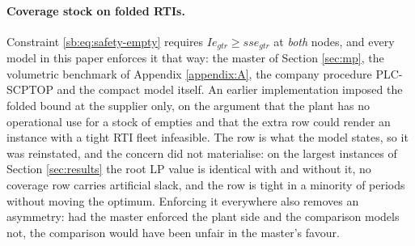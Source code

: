 \paragraph{Coverage stock on folded RTIs.}
Constraint \eqref{sb:eq:safety-empty} requires $Ie_{gtr}\ge sse_{gtr}$ at
\emph{both} nodes, and every model in this paper enforces it that way:
the master of Section \ref{sec:mp}, the volumetric benchmark of
Appendix \ref{appendix:A}, the company procedure PLC-SCPTOP and the
compact model itself. An earlier implementation imposed the folded bound
at the supplier only, on the argument that the plant has no operational
use for a stock of empties and that the extra row could render an
instance with a tight RTI fleet infeasible. The row is what the model
states, so it was reinstated, and the concern did not materialise: on
the largest instances of Section \ref{sec:results} the root LP value is
identical with and without it, no coverage row carries artificial slack,
and the row is tight in a minority of periods without moving the
optimum. Enforcing it everywhere also removes an asymmetry: had the
master enforced the plant side and the comparison models not, the
comparison would have been unfair in the master's favour.

